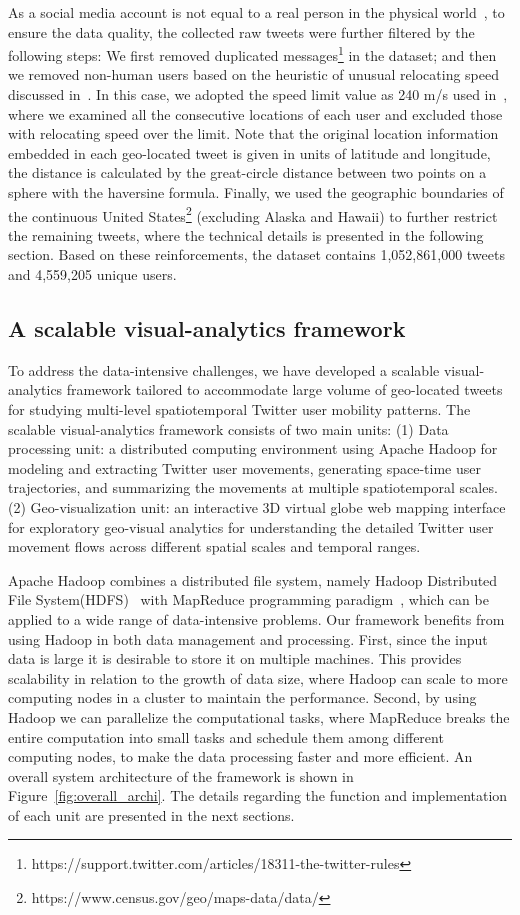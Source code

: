 \documentclass[ijgi,article,submit,moreauthors,pdftex,10pt,a4paper]{mdpi}
\theoremstyle{mdpi}
\newcounter{ex}
\newcounter{re}
\theoremstyle{mdpidefinition}
\begin{document}
As a social media account is not equal to a real person in the physical world~\cite{tsou2015}, to ensure the data quality, the collected raw tweets were further filtered by the following steps: We first removed duplicated messages\footnote{https://support.twitter.com/articles/18311-the-twitter-rules} in the dataset; and then we removed non-human users based on the heuristic of unusual relocating speed discussed in~\cite{hawelka2014geo,Jurdak2015}. 
In this case, we adopted the speed limit value as 240 m/s used in~\cite{Jurdak2015}, where we examined all the consecutive locations of each user and excluded those with relocating speed over the limit.
Note that the original location information embedded in each geo-located tweet is given in units of latitude and longitude, the distance is calculated by the great-circle distance between two points on a sphere with the haversine formula.
Finally, we used the geographic boundaries of the continuous United States\footnote{https://www.census.gov/geo/maps-data/data/} (excluding Alaska and Hawaii) to further restrict the remaining tweets, where the technical details is presented in the following section. Based on these reinforcements, the dataset contains 1,052,861,000 tweets and 4,559,205 unique users.

\subsection{A scalable visual-analytics framework}
To address the data-intensive challenges, we have developed a scalable visual-analytics framework tailored to accommodate large volume of geo-located tweets for studying multi-level spatiotemporal Twitter user mobility patterns.
The scalable visual-analytics framework consists of two main units: (1) Data processing unit: a distributed computing environment using Apache Hadoop for modeling and extracting Twitter user movements, generating space-time user trajectories, and summarizing the movements at multiple spatiotemporal scales.
(2) Geo-visualization unit: an interactive 3D virtual globe web mapping interface for exploratory geo-visual analytics for understanding the detailed Twitter user movement flows across different spatial scales and temporal ranges. 

Apache Hadoop combines a distributed file system, namely Hadoop Distributed File System(HDFS)~\cite{shvachko2010hadoop} with MapReduce programming paradigm~\cite{dean2008mapreduce}, which can be applied to a wide range of data-intensive problems.
Our framework benefits from using Hadoop in both data management and processing.
First, since the input data is large it is desirable to store it on multiple machines.
This provides scalability in relation to the growth of data size, where Hadoop can scale to more computing nodes in a cluster to maintain the performance.
Second, by using Hadoop we can parallelize the computational tasks, where MapReduce breaks the entire computation into small tasks and schedule them among different computing nodes, to make the data processing faster and more efficient.
An overall system architecture of the framework is shown in Figure~\ref{fig:overall_archi}.
The details regarding the function and implementation of each unit are presented in the next sections.
\end{document}
